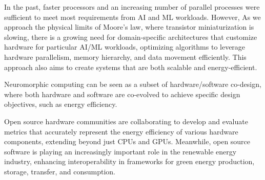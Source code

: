 In the past, faster processors and an increasing number of parallel processes were sufficient to meet most requirements from AI and ML workloads. However, As we approach the physical limits of Moore’s law, where transistor miniaturization is slowing, there is a growing need for domain-specific architectures that customize hardware for particular AI/ML workloads, optimizing algorithms to leverage hardware parallelism, memory hierarchy, and data movement efficiently. This approach also aims to create systems that are both scalable and energy-efficient.

Neuromorphic computing can be seen as a subset of hardware/software co-design, where both hardware and software are co-evolved to achieve specific design objectives, such as energy efficiency.

Open source hardware communities are collaborating to develop and evaluate metrics that accurately represent the energy efficiency of various hardware components, extending beyond just CPUs and GPUs. Meanwhile, open source software is playing an increasingly important role in the renewable energy industry, enhancing interoperability in frameworks for green energy production, storage, transfer, and consumption.





